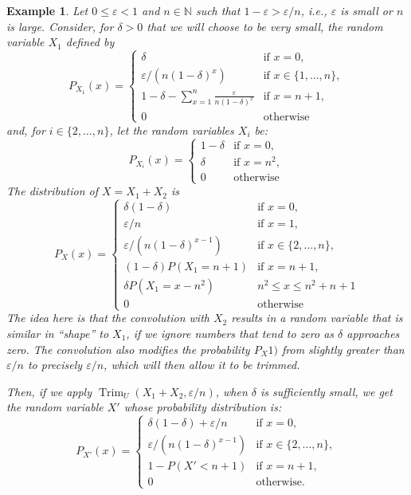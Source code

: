 \documentclass[review]{elsarticle}
\newtheorem{example}{Example}
\DeclareMathOperator{\Trim}{Trim}
\begin{document}
\begin{example}\label{exp:seq}
	Let $0 {\leq} \varepsilon {<}1$ and $n {\in} \mathbb{N}$ such that $1{-}\varepsilon {>} {\varepsilon }/{n}$, i.e.,  
	$\varepsilon$ is small or $n$ is large. 
	Consider, for $\delta>0$ that we will choose to be very small, the random variable $X_1$ defined by
	$$
	P_{X_1}(x) {=} \begin{cases}
	\delta  & \text{if } x=0, \\
	{\varepsilon }/{(n (1-\delta )^{x})} & \text{if } x\in\{1,\dots,n\}, \\
	1{-}\delta{-}\sum_{x=1}^n \frac{\varepsilon }{n(1-\delta )^{x}} & \text{if } x=n+1, \\
	0 & \text{otherwise}
	\end{cases}
	$$
	and, for $i\in\{2,\dots,n\}$, let the random variables $X_i$ be:
	$$
	P_{X_i}(x) =\begin{cases}
	1-\delta  & \text{if } x=0, \\
	\delta     & \text{if } x=n^2, \\
	0 & \text{otherwise}
	\end{cases}
	$$
	The distribution of $X=X_1+X_2$ is
	$$
	P_{X}(x) {=} 
	\begin{cases}
	\delta(1-\delta)  & \text{if } x=0, \\
	{\varepsilon }/{n} & \text{if } x=1, \\
	{\varepsilon }/{(n (1-\delta )^{x-1})} & \text{if } x\in\{2,\dots,n\}, \\
	(1{-}\delta)P(X_1{=}n{+}1)& \text{if } x=n+1, \\
	\delta P(X_1{=}x{-}n^2)& n^2 {\leq} x {\leq} n^2{+}n{+}1 \\
	0 & \text{otherwise}
	\end{cases}
	$$
	The idea here is that the convolution with $X_2$ results in a random variable that is similar in ``shape'' to $X_1$, 
	if we ignore numbers that tend to zero as $\delta$ approaches zero. The convolution also
	modifies the probability $P_{X}1)$ from slightly greater than  $\varepsilon/n$ to precisely $\varepsilon/n$, which will then allow it
	to be trimmed.
	
	Then, if we apply $\Trim_U(X_1+X_2,\varepsilon/n)$, when $\delta$ is sufficiently small, we get the random variable $X'$ whose probability distribution is:
	$$
	P_{X'}(x) {=} 
	\begin{cases}
	\delta(1-\delta)+{\varepsilon }/{n}  & \text{if } x=0, \\
	{\varepsilon }/{(n (1-\delta )^{x-1})} & \text{if } x\in\{2,\dots,n\}, \\
	1-P(X'{<}n+1)& \text{if } x=n+1, \\
	0 & \text{otherwise.}
	\end{cases}
	$$ 
	

\end{example}
\end{document}
